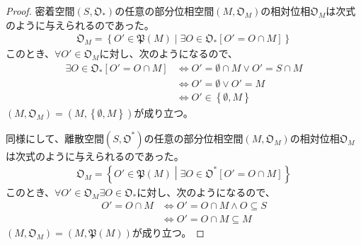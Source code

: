 \documentclass[dvipdfmx]{jsarticle}
\begin{document}
\begin{proof}
密着空間$\left( S,\mathfrak{O}_{*} \right)$の任意の部分位相空間$\left( M,\mathfrak{O}_{M} \right)$の相対位相$\mathfrak{O}_{M}$は次式のように与えられるのであった。
\begin{align*}
\mathfrak{O}_{M} = \left\{ O'\in \mathfrak{P}(M) \middle| \exists O \in \mathfrak{O}_{*}\left[ O' = O \cap M \right] \right\}
\end{align*}
このとき、$\forall O' \in \mathfrak{O}_{M}$に対し、次のようになるので、
\begin{align*}
\exists O \in \mathfrak{O}_{*}\left[ O' = O \cap M \right] &\Leftrightarrow O' = \emptyset \cap M \vee O' = S \cap M\\
&\Leftrightarrow O' = \emptyset \vee O' = M\\
&\Leftrightarrow O' \in \left\{ \emptyset,M \right\}
\end{align*}
$\left( M,\mathfrak{O}_{M} \right) = \left( M,\left\{ \emptyset,M \right\} \right)$が成り立つ。\par
同様にして、離散空間$\left( S,\mathfrak{O}^{*} \right)$の任意の部分位相空間$\left( M,\mathfrak{O}_{M} \right)$の相対位相$\mathfrak{O}_{M}$は次式のように与えられるのであった。
\begin{align*}
\mathfrak{O}_{M} = \left\{ O'\in \mathfrak{P}(M) \middle| \exists O \in \mathfrak{O}^{*}\left[ O' = O \cap M \right] \right\}
\end{align*}
このとき、$\forall O' \in \mathfrak{O}_{M}\exists O \in \mathfrak{O}_{*}$に対し、次のようになるので、
\begin{align*}
O' = O \cap M &\Leftrightarrow O' = O \cap M \land O \subseteq S\\
&\Leftrightarrow O' = O \cap M \subseteq M
\end{align*}
$\left( M,\mathfrak{O}_{M} \right) = \left( M,\mathfrak{P}(M) \right)$が成り立つ。
\end{proof}
\end{document}
